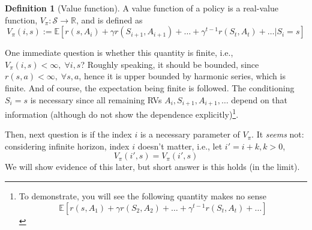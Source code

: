 \documentclass[11pt,a4paper]{article}
\theoremstyle{definition}
\newcounter{definition_counter}
\newtheorem{definitionx}[definition_counter]{Definition}
\newenvironment{definition}
{
    \definecolor{shadecolor}{named}{SkyBlue}
    \begin{shaded}
    \begin{definitionx}
}
  {\end{definitionx}
\end{shaded}}
\theoremstyle{remark}
\begin{document}
\begin{definition}[Value function]
A value function of a policy is a real-value function, $V_{\pi}: \mathcal{S} \rightarrow \mathbb{R}$, and is defined as
\begin{equation}
    \label{eq:V_def}
V_{\pi}(i, s) := \mathbb{E} \left[ r(s, A_i) + \gamma r(S_{i+1}, A_{i+1}) + \ldots  + \gamma^{t-1} r(S_t, A_t) + \ldots | S_i = s \right]
\end{equation} 
\end{definition}
One immediate question is whether this quantity is finite, i.e., $V_{\pi}(i, s) < \infty , \; \forall i, s$? Roughly speaking, it should be bounded, since $r(s, a) < \infty , \; \forall s, a$, hence it is upper bounded by harmonic series, which is finite.  And of course, the expectation being finite is followed.
The conditioning $S_i=s$ is necessary since all remaining RVs $A_{i}, S_{i+1}, A_{i+1}, \ldots $ depend on that information (although do not show the dependence explicitly)\footnote{To demonstrate, you will see the following quantity makes no sense
\[
\mathbb{E} \left[ r(s, A_1) + \gamma r(S_2, A_2) + \ldots  + \gamma^{t-1} r(S_t, A_t) + \ldots \right]
\] 
}. 

Then, next question is if the index $i$ is a necessary parameter of $V_\pi$. It \textit{seems} not: considering infinite horizon, index $i$ doesn't matter, i.e., let $i' = i + k, k> 0$,
\begin{equation}
    \label{eq:value_time_invariant}
V_\pi(i', s) = V_\pi(i', s)
\end{equation} 
We will show evidence of this later, but short answer is this holds (in the limit).
\end{document}

